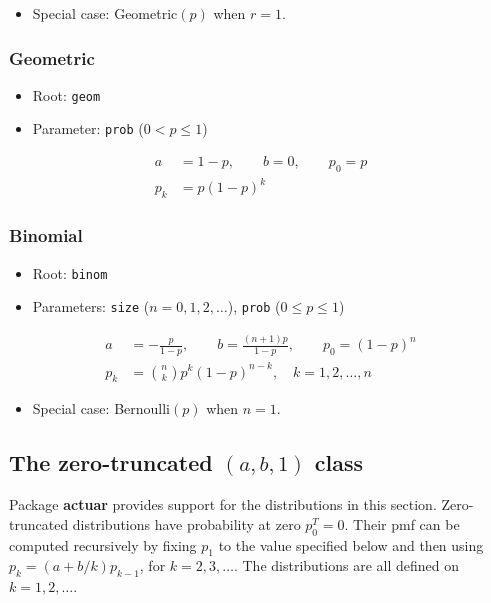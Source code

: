 \documentclass[x11names]{article}
\newcommand{\pkg}[1]{\textbf{#1}}
\newcommand{\code}[1]{\texttt{#1}}
\begin{document}
\begin{itemize}
\item Special case: Geometric$(p)$ when $r = 1$.
\end{itemize}

\subsubsection{Geometric}

\begin{itemize}
\item Root: \code{geom}
\item Parameter: \code{prob} ($0 < p \leq 1$)
\end{itemize}
\begin{align*}
  a &= 1 - p, \qquad b = 0, \qquad p_0 = p \\
  p_k &= p (1 - p)^k
\end{align*}

\subsubsection{Binomial}

\begin{itemize}
\item Root: \code{binom}
\item Parameters: \code{size} ($n = 0, 1, 2, \dots$),
  \code{prob} ($0 \leq p \leq 1$)
\end{itemize}
\begin{align*}
  a &= -\frac{p}{1 - p}, \qquad b = \frac{(n + 1)p}{1 - p}, \qquad p_0 = (1 - p)^n \\
  p_k &= \binom{n}{k} p^k (1 - p)^{n - k}, \quad
        k = 1, 2, \dots, n
\end{align*}

\begin{itemize}
\item Special case: Bernoulli$(p)$ when $n = 1$.
\end{itemize}


\subsection[The zero-truncated (a, b, 1) class]{The zero-truncated $(a, b, 1)$ class}
\label{sec:app:discrete:zt}

Package \pkg{actuar} provides support for the distributions in this
section. Zero-truncated distributions have probability at zero
$p_0^T = 0$. Their pmf can be computed recursively by fixing $p_1$ to
the value specified below and then using $p_k = (a + b/k) p_{k - 1}$,
for $k = 2, 3, \dots$. The distributions are all defined on
$k = 1, 2, \dots$.
\end{document}
